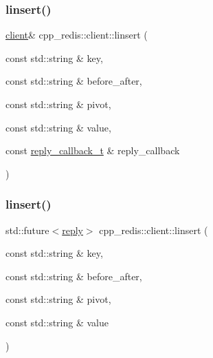 \subsubsection{\texorpdfstring{linsert()}{linsert()}\hspace{0.1cm}{\footnotesize\ttfamily [1/2]}}
{\footnotesize\ttfamily \hyperlink{classcpp__redis_1_1client}{client}\& cpp\+\_\+redis\+::client\+::linsert (\begin{DoxyParamCaption}\item[{const std\+::string \&}]{key,  }\item[{const std\+::string \&}]{before\+\_\+after,  }\item[{const std\+::string \&}]{pivot,  }\item[{const std\+::string \&}]{value,  }\item[{const \hyperlink{classcpp__redis_1_1client_a061a1140d36d2eaeda82b09a0bb3f9f2}{reply\+\_\+callback\+\_\+t} \&}]{reply\+\_\+callback }\end{DoxyParamCaption})}

\mbox{\label{classcpp__redis_1_1client_ab8d167d78e3c956fd1ade0e2f992f46a}} 
\subsubsection{\texorpdfstring{linsert()}{linsert()}\hspace{0.1cm}{\footnotesize\ttfamily [2/2]}}
{\footnotesize\ttfamily std\+::future$<$\hyperlink{classcpp__redis_1_1reply}{reply}$>$ cpp\+\_\+redis\+::client\+::linsert (\begin{DoxyParamCaption}\item[{const std\+::string \&}]{key,  }\item[{const std\+::string \&}]{before\+\_\+after,  }\item[{const std\+::string \&}]{pivot,  }\item[{const std\+::string \&}]{value }\end{DoxyParamCaption})}

\mbox{\label{classcpp__redis_1_1client_a2e0a911a6bb87224896b7c33da7ac058}} 
